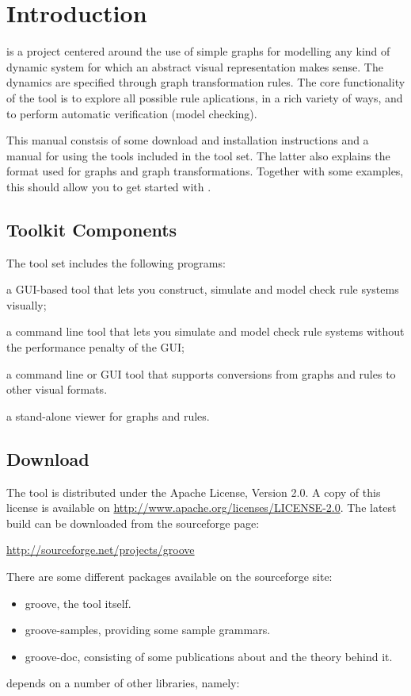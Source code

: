 \clearpage
\section{Introduction}

\GROOVE is a project centered around the use of simple graphs for modelling
any kind of dynamic system for which an abstract visual representation makes sense. The dynamics are specified through graph transformation rules. The core functionality of the tool is to explore all possible rule aplications, in a rich variety of ways, and to perform automatic verification (model checking).

This manual constsis of some download and installation instructions and a
manual for using the tools included in the \GROOVE tool set. The latter also
explains the format used for graphs and graph transformations. Together
with some examples, this should allow you to get started with \GROOVE.

\subsection{Toolkit Components}

The \GROOVE tool set includes the following programs:
\begin{description}\noitemsep
\item[Simulator:] a GUI-based tool that lets you construct, simulate and
  model check rule systems visually;
\item[Generator:] a command line tool that lets you simulate and model check
  rule systems without the performance penalty of the GUI;
\item[Imager:] a command line or GUI tool that supports conversions from
  \GROOVE graphs and rules to other visual formats.
\item[Viewer:] a stand-alone viewer for \GROOVE graphs and rules.
\end{description}

\subsection{Download}

The \GROOVE tool is distributed under the Apache License, Version 2.0. A copy
of this license is available on
\url{http://www.apache.org/licenses/LICENSE-2.0}.  The latest \GROOVE build
can be downloaded from the \GROOVE sourceforge page:

\begin{center}
\url{http://sourceforge.net/projects/groove}
\end{center}
%
There are some different packages available on the sourceforge site:
%
\begin{itemize}[noitemsep]
\item \textsf{groove}, the tool itself.
\item \textsf{groove-samples}, providing some sample grammars.
\item \textsf{groove-doc}, consisting of some publications about \GROOVE and
  the theory behind it.
\end{itemize}
%
\GROOVE depends on a number of other libraries, namely:

